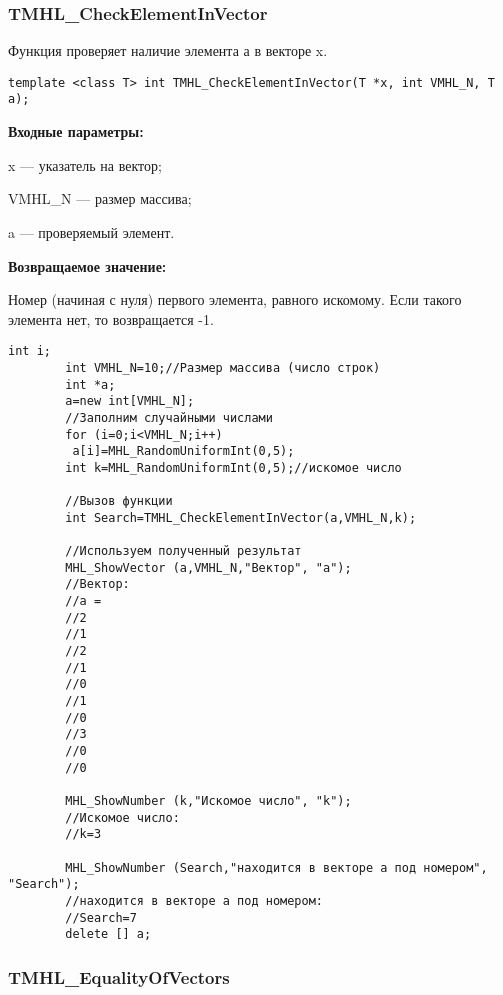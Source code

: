 \documentclass[a4paper,12pt]{article}
\begin{document}
\subsubsection{TMHL\_CheckElementInVector}\label{TMHL_CheckElementInVector}

Функция проверяет наличие элемента а в векторе x.


\begin{lstlisting}[label=code_syntax_TMHL_CheckElementInVector,caption=Синтаксис]
template <class T> int TMHL_CheckElementInVector(T *x, int VMHL_N, T a);
\end{lstlisting}

\textbf{Входные параметры:}

   x --- указатель на вектор;
   
 VMHL\_N --- размер массива;
 
 a --- проверяемый элемент.

\textbf{Возвращаемое значение:}

 Номер (начиная с нуля) первого элемента, равного искомому. Если такого элемента нет, то возвращается -1.


\begin{lstlisting}[label=code_use_TMHL_CheckElementInVector,caption=Пример использования]
        int i;
        int VMHL_N=10;//Размер массива (число строк)
        int *a;
        a=new int[VMHL_N];
        //Заполним случайными числами
        for (i=0;i<VMHL_N;i++)
         a[i]=MHL_RandomUniformInt(0,5);
        int k=MHL_RandomUniformInt(0,5);//искомое число

        //Вызов функции
        int Search=TMHL_CheckElementInVector(a,VMHL_N,k);

        //Используем полученный результат
        MHL_ShowVector (a,VMHL_N,"Вектор", "a");
        //Вектор:
        //a =
        //2
        //1
        //2
        //1
        //0
        //1
        //0
        //3
        //0
        //0

        MHL_ShowNumber (k,"Искомое число", "k");
        //Искомое число:
        //k=3

        MHL_ShowNumber (Search,"находится в векторе a под номером", "Search");
        //находится в векторе a под номером:
        //Search=7
        delete [] a;
\end{lstlisting}

\subsubsection{TMHL\_EqualityOfVectors}\label{TMHL_EqualityOfVectors}
\end{document}
